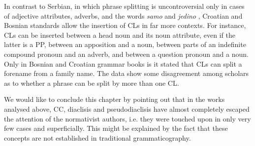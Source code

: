 In contrast to Serbian, in which phrase splitting is uncontroversial only in cases of adjective attributes, adverbs, and the words \textit{samo} and \textit{jedino} \citep[cf.][450]{PiperKlajn14}, Croatian and Bosnian standards allow the insertion of CLs in far more contexts. For instance, CLs can be inserted between a head noun and its noun attribute, even if the latter is a PP, between an apposition and a noun, between parts of an indefinite compound pronoun and an adverb, and between a question pronoun and a noun. Only in Bosnian and Croatian grammar books is it stated that CLs can split a forename from a family name. The data show some disagreement among scholars as to whether a phrase can be split by more than one CL. 

We would like to conclude this chapter by pointing out that in the works analysed above, CC, diaclisis and pseudodiaclisis have almost completely escaped the attention of the normativist authors, i.e. they were touched upon in only very few cases and superficially. This might be explained by the fact that these concepts are not established in traditional grammaticography. 

